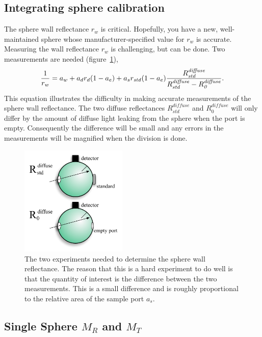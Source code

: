 \documentclass{article}
\begin{document}
\subsection{Integrating sphere calibration}
\label{rwmeasurement}
The sphere wall reflectance $r_w$ is critical.  Hopefully, you have a new,
well-maintained sphere whose manufacturer-specified value for $r_w$ is 
accurate.  Measuring the wall reflectance $r_w$ is challenging, but can be done.  Two measurements are 
needed (figure~\ref{sphererw}),
\begin{equation}
{1\over r_w} =  a_w + a_d r_d (1-a_e) + a_s 
r_{\mathit{std}} (1-a_e) {{R^{\mathit{diffuse}}_{\mathit{std}}} \over R^{\mathit{diffuse}}_{\mathit{std}} - {R^{\mathit{diffuse}}_\mathit{0}}}.
\end{equation}
This equation illustrates the difficulty in making accurate measurements 
of the sphere wall reflectance.  The two diffuse reflectances 
$R^{\mathit{diffuse}}_{\mathit{std}}$ and $R^{\mathit{diffuse}}_\mathit{0}$ 
will only differ by the amount of diffuse light leaking from the sphere 
when the port is empty.  Consequently the difference will be small and 
any errors in the measurements will be magnified when the division is done.

\begin{figure}[!h]
\centering
\includegraphics[width=2in]{ch3spheremeas.pdf}
\caption{The two experiments needed to determine the sphere wall reflectance.
The reason that this is a hard experiment to do well is that the quantity of
interest is the difference between the two measurements.  This is a small 
difference and is roughly proportional to the relative area of the sample
port $a_s$.}
\label{sphererw}
\end{figure}

\clearpage
\subsection{Single Sphere $M_R$ and $M_T$}
\end{document}
